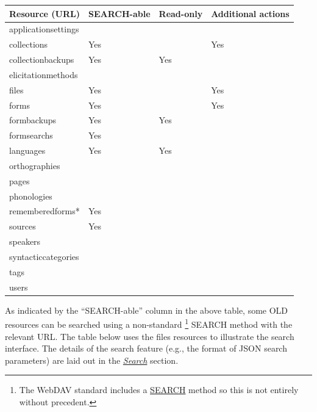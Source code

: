 \documentclass[letterpaper,10pt,english]{sphinxmanual}
\begin{document}
\begin{tabulary}{\linewidth}{|L|L|L|L|}
\hline
\textbf{
Resource (URL)
} & \textbf{
SEARCH-able
} & \textbf{
Read-only
} & \textbf{
Additional actions
}\\\hline

applicationsettings
 &  &  & \\\hline

collections
 & 
Yes
 &  & 
Yes
\\\hline

collectionbackups
 & 
Yes
 & 
Yes
 & \\\hline

elicitationmethods
 &  &  & \\\hline

files
 & 
Yes
 &  & 
Yes
\\\hline

forms
 & 
Yes
 &  & 
Yes
\\\hline

formbackups
 & 
Yes
 & 
Yes
 & \\\hline

formsearchs
 & 
Yes
 &  & \\\hline

languages
 & 
Yes
 & 
Yes
 & \\\hline

orthographies
 &  &  & \\\hline

pages
 &  &  & \\\hline

phonologies
 &  &  & \\\hline

rememberedforms*
 & 
Yes
 &  & \\\hline

sources
 & 
Yes
 &  & \\\hline

speakers
 &  &  & \\\hline

syntacticcategories
 &  &  & \\\hline

tags
 &  &  & \\\hline

users
 &  &  & \\\hline
\end{tabulary}


As indicated by the ``SEARCH-able'' column in the above table, some OLD resources
can be searched using a non-standard \footnote{
The WebDAV standard includes a \href{http://www.webdav.org/specs/rfc5323.html}{SEARCH}
method so this is not entirely without precedent.
} SEARCH method with the relevant URL.
The table below uses the files resources to illustrate the search interface.
The details of the search feature (e.g., the format of JSON search parameters)
are laid out in the {\hyperref[interface:search-old]{\emph{Search}}} section.
\end{document}
